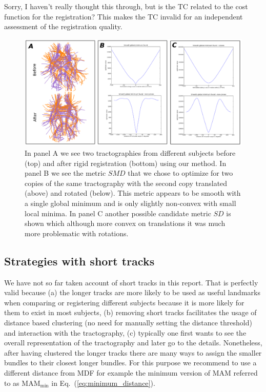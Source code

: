 \documentclass[preprint,authoryear,a4paper,10pt,onecolumn]{elsarticle}
\begin{document}
\begin{matthewsays}
  Sorry, I haven't really thought this through, but is the TC related to the
  cost function for the registration?  This makes the TC invalid for an
  independent assessment of the registration quality.
\end{matthewsays}

%
\begin{figure}
\begin{centering}
\includegraphics[scale=0.8]{last_figures/LSC_registration2}
\par\end{centering}
\caption{In panel A we see two tractographies from different subjects
  before (top) and after rigid registration (bottom) using our
  method. In panel B we see the metric $SMD$ that we chose to optimize
  for two copies of the same tractography with the second copy
  translated (above) and rotated (below). This metric appears to be
  smooth with a single global minimum and is only slightly non-convex
  with small local minima. In panel C another possible candidate metric
  $SD$ is shown which although more convex on translations it was much
  more problematic with rotations.\label{Flo:direct_registration}}
\end{figure}

\subsection{Strategies with short tracks}

We have not so far taken account of short tracks in this report. That
is perfectly valid because (a) the longer tracks are more likely to
be used as useful landmarks when comparing or registering different
subjects because it is more likely for them to exist in most subjects,
(b) removing short tracks facilitates the usage of distance based
clustering (no need for manually setting the distance threshold) and
interaction with the tractography, (c) typically one first wants to
see the overall representation of the tractography and later go to
the details. Nonetheless, after having clustered the longer tracks
there are many ways to assign the smaller bundles to their closest
longer bundles. For this purpose we recommend to use a different distance
from MDF for example the minimum version of MAM referred
to as $\textrm{MAM}_{\textrm{min}}$ in Eq.~(\ref{eq:minimum_distance}). 
\end{document}
